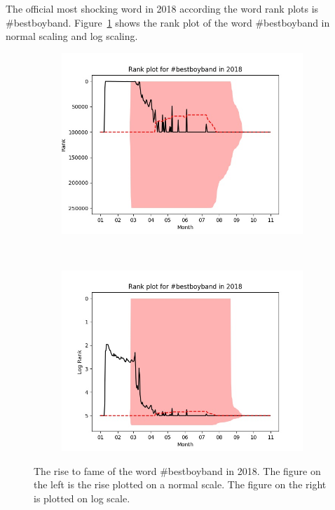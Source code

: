 \documentclass{article}
\begin{document}
The official most shocking word in 2018 according the word rank plots is
\#bestboyband. 
Figure~\ref{Fig:bestboyband} shows the rank plot of the word \#bestboyband in
normal scaling and log scaling.
\begin{figure}
    \centering
    \begin{subfigure}{0.45\textwidth}
        \includegraphics[width=\textwidth]{bestboyband-2018.jpg}
    \end{subfigure}
    ~
    \begin{subfigure}{0.45\textwidth}
        \includegraphics[width=\textwidth]{bestboyband-2018-LOG.jpg}
    \end{subfigure}
    \caption{\label{Fig:bestboyband} The rise to fame of the word \#bestboyband
in 2018.  The figure on the left is the rise plotted on a normal scale.
The figure on the right is plotted on log scale.}
\end{figure}
\end{document}

